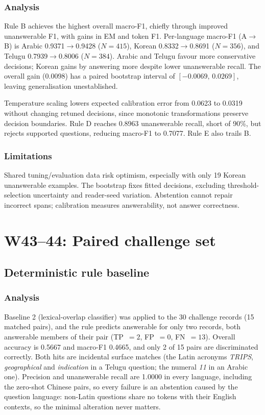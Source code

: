 \documentclass[11pt]{article}
\begin{document}
\subsubsection*{Analysis}

\noindent
Rule B achieves the highest overall macro-F1, chiefly through improved unanswerable F1, with gains in EM and token F1. Per-language macro-F1 (A$\rightarrow$B) is Arabic 0.9371$\rightarrow$0.9428 ($N=415$), Korean 0.8332$\rightarrow$0.8691 ($N=356$), and Telugu 0.7939$\rightarrow$0.8006 ($N=384$). Arabic and Telugu favour more conservative decisions; Korean gains by answering more despite lower unanswerable recall. The overall gain (0.0098) has a paired bootstrap interval of $[-0.0069,\,0.0269]$, leaving generalisation unestablished.

\noindent
Temperature scaling lowers expected calibration error from 0.0623 to 0.0319 without changing retuned decisions, since monotonic transformations preserve decision boundaries. Rule D reaches 0.8963 unanswerable recall, short of 90\%, but rejects supported questions, reducing macro-F1 to 0.7077. Rule E also trails B.

\subsubsection*{Limitations}

\noindent
Shared tuning/evaluation data risk optimism, especially with only 19 Korean unanswerable examples. The bootstrap fixes fitted decisions, excluding threshold-selection uncertainty and reader-seed variation. Abstention cannot repair incorrect spans; calibration measures answerability, not answer correctness.

\section{W43--44: Paired challenge set}

\subsection{Deterministic rule baseline}

\subsubsection*{Analysis}

\noindent
Baseline 2 (lexical-overlap classifier) was applied to the 30 challenge records (15 matched pairs), and the rule predicts answerable for only two records, both answerable members of their pair (TP~$=2$, FP~$=0$, FN~$=13$). Overall accuracy is 0.5667 and macro-F1 0.4665, and only 2 of 15 pairs are discriminated correctly. Both hits are incidental surface matches (the Latin acronyms \emph{TRIPS}, \emph{geographical} and \emph{indication} in a Telugu question; the numeral \emph{11} in an Arabic one). Precision and unanswerable recall are 1.0000 in every language, including the zero-shot Chinese pairs, so every failure is an abstention caused by the question language: non-Latin questions share no tokens with their English contexts, so the minimal alteration never matters.
\end{document}
